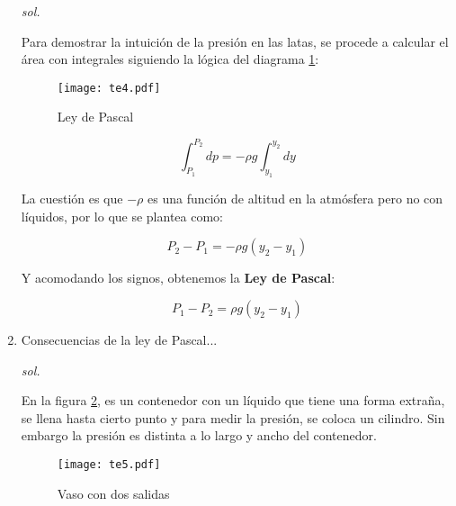 \begin{enumerate}
    \textit{sol. }
    
    Para demostrar la intuición de la presión en las latas, se procede a calcular el área con integrales siguiendo la lógica del diagrama \ref{te4}:
    
    \begin{figure}[h!]
      \centering
      \texttt{[image: te4.pdf]}
      \caption{Ley de Pascal}
      \label{te4}
    \end{figure}

\begin{equation}
    \int^{P_2}_{P_1}dp=-\rho g\int^{y_2}_{y_1}dy
\end{equation}
    
    La cuestión es que $-\rho$ es una función de altitud en la atmósfera pero no con líquidos, por lo que se plantea como:
    
    \begin{equation*}
        P_2-P_1=-\rho g\left(y_2-y_1 \right)
    \end{equation*}
    
    Y acomodando los signos, obtenemos la \textbf{Ley de Pascal}:
    
    \begin{equation}
        P_1-P_2=\rho g\left(y_2-y_1 \right)
    \end{equation}

    \item  Consecuencias de la ley de Pascal...
    
    \textit{sol. }
    
        En la figura \ref{te5}, es un contenedor con un líquido que tiene una forma extraña, se llena hasta cierto punto y para medir la presión, se coloca un cilindro. Sin embargo la presión es distinta a lo largo y ancho del contenedor.
    
        \begin{figure}[h!]
      \centering
      \texttt{[image: te5.pdf]}
      \caption{Vaso con dos salidas}
      \label{te5}
    \end{figure}
    


\end{enumerate}
